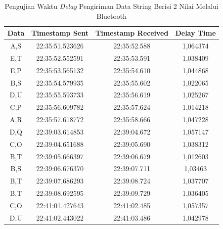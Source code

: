 \begin{longtable}{|ccc|c|}
  \caption{Pengujian Waktu \emph{Delay} Pengiriman Data String Berisi 2 Nilai Melalui Bluetooth}
  \label{tbl:delayBluetooth}\\
  \hline
  \multicolumn{1}{|c|}{Data} & \multicolumn{1}{c|}{Timestamp Sent}  & Timestamp Received & Delay Time  \\ \hline
  \endfirsthead
  \endhead
  \multicolumn{1}{|c|}{A,S}  & \multicolumn{1}{c|}{22:35:51.523626} & 22:35:52.588       & 1,064374    \\ \hline
  \multicolumn{1}{|c|}{E,T}  & \multicolumn{1}{c|}{22:35:52.552591} & 22:35:53.591       & 1,038409    \\ \hline
  \multicolumn{1}{|c|}{E,P}  & \multicolumn{1}{c|}{22:35:53.565132} & 22:35:54.610       & 1,044868    \\ \hline
  \multicolumn{1}{|c|}{B,S}  & \multicolumn{1}{c|}{22:35:54.579935} & 22:35:55.602       & 1,022065    \\ \hline
  \multicolumn{1}{|c|}{D,U}  & \multicolumn{1}{c|}{22:35:55.593733} & 22:35:56.619       & 1,025267    \\ \hline
  \multicolumn{1}{|c|}{C,P}  & \multicolumn{1}{c|}{22:35:56.609782} & 22:35:57.624       & 1,014218    \\ \hline
  \multicolumn{1}{|c|}{A,R}  & \multicolumn{1}{c|}{22:35:57.618772} & 22:35:58.666       & 1,047228    \\ \hline
  \multicolumn{1}{|c|}{D,Q}  & \multicolumn{1}{c|}{22:39:03.614853} & 22:39:04.672       & 1,057147    \\ \hline
  \multicolumn{1}{|c|}{C,O}  & \multicolumn{1}{c|}{22:39:04.651688} & 22:39:05.690       & 1,038312    \\ \hline
  \multicolumn{1}{|c|}{B,T}  & \multicolumn{1}{c|}{22:39:05.666397} & 22:39:06.679       & 1,012603    \\ \hline
  \multicolumn{1}{|c|}{B,S}  & \multicolumn{1}{c|}{22:39:06.676370} & 22:39:07.711       & 1,03463     \\ \hline
  \multicolumn{1}{|c|}{B,T}  & \multicolumn{1}{c|}{22:39:07.686293} & 22:39:08.724       & 1,037707    \\ \hline
  \multicolumn{1}{|c|}{B,T}  & \multicolumn{1}{c|}{22:39:08.692595} & 22:39:09.729       & 1,036405    \\ \hline
  \multicolumn{1}{|c|}{C,O}  & \multicolumn{1}{c|}{22:41:01.427643} & 22:41:02.485       & 1,057357    \\ \hline
  \multicolumn{1}{|c|}{D,U}  & \multicolumn{1}{c|}{22:41:02.443022} & 22:41:03.486       & 1,042978    \\ \hline

\end{longtable}
